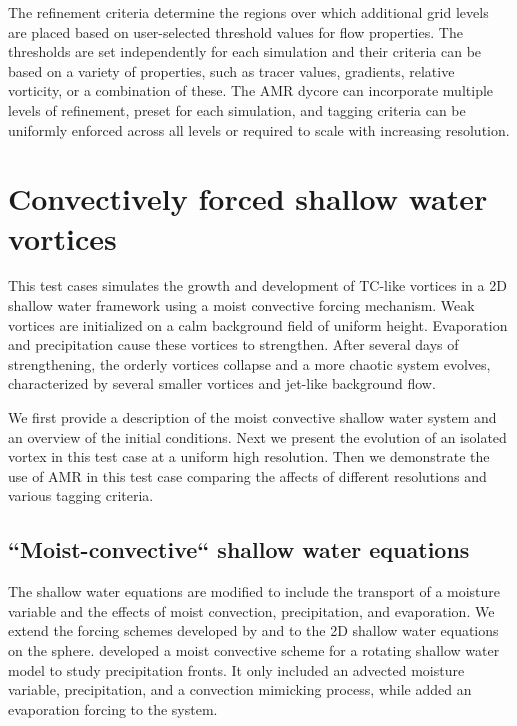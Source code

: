  The refinement criteria determine the regions over which additional 
  grid levels are placed based on user-selected threshold values for 
  flow properties.  The thresholds are set independently for each 
  simulation and their criteria can be based on a variety of properties, 
  such as tracer values, gradients, relative vorticity, or a combination of 
  these. The AMR dycore can incorporate multiple levels of refinement, 
  preset for each simulation, and tagging criteria can be uniformly 
  enforced across all levels or required to scale with increasing resolution.
 
\section{Convectively forced shallow water vortices}
\label{sec:forcedvort} 
  This test cases simulates the growth and development of TC-like 
  vortices in a 2D shallow water framework using a moist convective forcing 
  mechanism. Weak vortices are initialized on a calm background field 
  of uniform height. Evaporation and precipitation cause these vortices to strengthen. 
  After several days of strengthening, the orderly vortices collapse and a more chaotic 
  system evolves, characterized by several smaller vortices and jet-like background flow. 

  We first provide a description of the moist convective shallow water system 
  and an overview of the initial conditions. Next we present the evolution of an 
  isolated vortex in this test case at a uniform high resolution. Then we demonstrate
  the use of AMR in this test case comparing the affects of different resolutions and
  various tagging criteria.

  \subsection{``Moist-convective`` shallow water equations }
     The shallow water equations are modified to include the transport of a 
     moisture variable and the effects of moist convection, precipitation, and evaporation. 
     We extend the forcing schemes developed by \cite{bouchut2009fronts} and 
     \cite{lahaye2016understanding} to the 2D shallow water equations on the sphere. 
     \cite{bouchut2009fronts} developed a moist convective scheme 
     for a rotating shallow water model to study precipitation fronts. 
     It only included an advected moisture variable, precipitation, and 
     a convection mimicking process, while \cite{lahaye2016understanding} 
     added an evaporation forcing to the system.  
     
